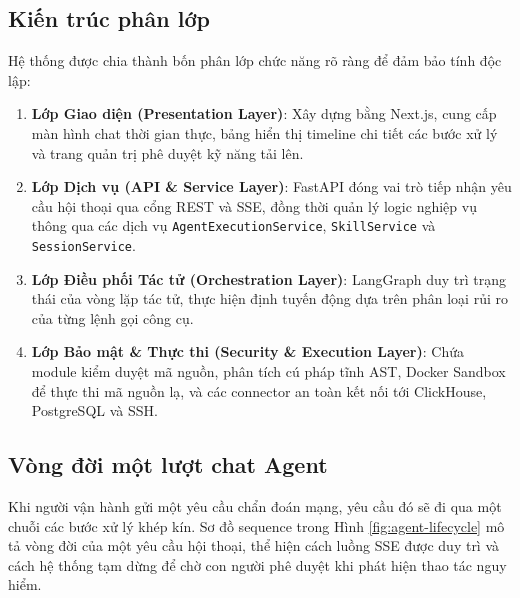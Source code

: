 \documentclass[12pt,a4paper]{article}
\begin{document}
\subsection{Kiến trúc phân lớp}
Hệ thống được chia thành bốn phân lớp chức năng rõ ràng để đảm bảo tính độc lập:
\begin{enumerate}
    \item \textbf{Lớp Giao diện (Presentation Layer)}: Xây dựng bằng Next.js, cung cấp màn hình chat thời gian thực, bảng hiển thị timeline chi tiết các bước xử lý và trang quản trị phê duyệt kỹ năng tải lên.
    \item \textbf{Lớp Dịch vụ (API \& Service Layer)}: FastAPI đóng vai trò tiếp nhận yêu cầu hội thoại qua cổng REST và SSE, đồng thời quản lý logic nghiệp vụ thông qua các dịch vụ \texttt{AgentExecutionService}, \texttt{SkillService} và \texttt{SessionService}.
    \item \textbf{Lớp Điều phối Tác tử (Orchestration Layer)}: LangGraph duy trì trạng thái của vòng lặp tác tử, thực hiện định tuyến động dựa trên phân loại rủi ro của từng lệnh gọi công cụ.
    \item \textbf{Lớp Bảo mật \& Thực thi (Security \& Execution Layer)}: Chứa module kiểm duyệt mã nguồn, phân tích cú pháp tĩnh AST, Docker Sandbox để thực thi mã nguồn lạ, và các connector an toàn kết nối tới ClickHouse, PostgreSQL và SSH.
\end{enumerate}

\subsection{Vòng đời một lượt chat Agent}
Khi người vận hành gửi một yêu cầu chẩn đoán mạng, yêu cầu đó sẽ đi qua một chuỗi các bước xử lý khép kín. Sơ đồ sequence trong Hình \ref{fig:agent-lifecycle} mô tả vòng đời của một yêu cầu hội thoại, thể hiện cách luồng SSE được duy trì và cách hệ thống tạm dừng để chờ con người phê duyệt khi phát hiện thao tác nguy hiểm.
\end{document}
